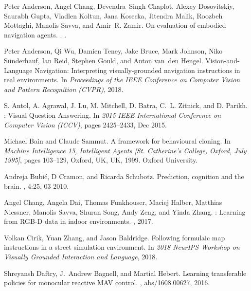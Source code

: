 \documentclass[10pt,twocolumn,letterpaper]{article}
\begin{document}
\begin{thebibliography}{10}\itemsep=-1pt

Peter Anderson, Angel Chang, Devendra~Singh Chaplot, Alexey Dosovitskiy,
  Saurabh Gupta, Vladlen Koltun, Jana Kosecka, Jitendra Malik, Roozbeh
  Mottaghi, Manolis Savva, and Amir~R. Zamir.
\newblock On evaluation of embodied navigation agents.
.
.

Peter Anderson, Qi Wu, Damien Teney, Jake Bruce, Mark Johnson, Niko
  S{\"u}nderhauf, Ian Reid, Stephen Gould, and Anton van~den Hengel.
\newblock Vision-and-{L}anguage {N}avigation: Interpreting visually-grounded
  navigation instructions in real environments.
\newblock In {\em Proceedings of the IEEE Conference on Computer Vision and
  Pattern Recognition (CVPR)}, 2018.

S. {Antol}, A. {Agrawal}, J. {Lu}, M. {Mitchell}, D. {Batra}, C.~L. {Zitnick},
  and D. {Parikh}.
: {V}isual {Q}uestion {A}nswering.
\newblock In {\em 2015 IEEE International Conference on Computer Vision
  (ICCV)}, pages 2425--2433, Dec 2015.

Michael Bain and Claude Sammut.
\newblock A framework for behavioural cloning.
\newblock In {\em Machine Intelligence 15, Intelligent Agents [St. Catherine's
  College, Oxford, July 1995]}, pages 103--129, Oxford, UK, UK, 1999. Oxford
  University.

Andreja Bubić, D Cramon, and Ricarda Schubotz.
\newblock Prediction, cognition and the brain.
, 4:25, 03 2010.

Angel Chang, Angela Dai, Thomas Funkhouser, Maciej Halber, Matthias Niessner,
  Manolis Savva, Shuran Song, Andy Zeng, and Yinda Zhang.
: Learning from {RGB-D} data in indoor environments.
, 2017.

Volkan Cirik, Yuan Zhang, and Jason Baldridge.
\newblock Following formulaic map instructions in a street simulation
  environment.
\newblock In {\em 2018 NeurIPS Workshop on Visually Grounded Interaction and
  Language}, 2018.

Shreyansh Daftry, J.~Andrew Bagnell, and Martial Hebert.
\newblock Learning transferable policies for monocular reactive {MAV} control.
, abs/1608.00627, 2016.


\end{thebibliography}
\end{document}
